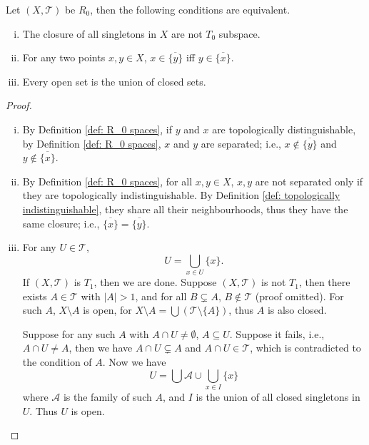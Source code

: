 \begin{proposition}
	\label{prop: alternative definitions of R_0 spaces}
	Let $(X, \mathcal T)$ be $R_0$, then the following conditions are equivalent.
	\begin{enumerate}[(i)]
		\item
		The closure of all singletons in $X$ are not $T_0$ subspace.
		
		\item
		For any two points $x,y \in X$, $x \in \overline{ \{y\} }$ iff $y \in \overline{ \{x\} }$.
		
		\item
		Every open set is the union of closed sets.
	\end{enumerate}
	
	\begin{proof}
		\
		\begin{enumerate}[(i)]
			\item
			By Definition \ref{def: R_0 spaces}, if $y$ and $x$ are topologically distinguishable, by Definition \ref{def: R_0 spaces}, $x$ and $y$ are separated; i.e., $x \notin \overline {\{y\}}$ and $y \notin \overline{\{x\}}$.
			
			\item
			By Definition \ref{def: R_0 spaces}, for all $x,y \in X$, $x,y$ are not separated only if they are topologically indistinguishable. By Definition \ref{def: topologically indistinguishable}, they share all their neighbourhoods, thus they have the same closure; i.e., $\overline{\{x\}} = \overline{\{y\}}$.
			
			\item
			For any $U \in \mathcal T$,
			$$
			U = \bigcup_{x \in U} \{x\}.
			$$
			If $(X, \mathcal T)$ is $T_1$, then we are done. Suppose $(X, \mathcal T)$ is not $T_1$, then there exists $A \in \mathcal T$ with $|A| > 1$, and for all $B \subsetneq A$, $B \notin \mathcal T$ (proof omitted). For such $A$, $X \setminus A$ is open, for $X \setminus A = \bigcup (\mathcal T \setminus \{A\})$, thus $A$ is also closed.
			
			Suppose for any such $A$ with $A \cap U \ne \emptyset$, $A \subseteq U$. Suppose it fails, i.e., $A \cap U \ne A$, then we have $A \cap U \subsetneq A$ and $A \cap U \in \mathcal T$, which is contradicted to the condition of $A$. Now we have
			$$
			U = \bigcup \mathcal A \cup \bigcup_{x \in I} \{x\}
			$$
			where $\mathcal A$ is the family of such $A$, and $I$ is the union of all closed singletons in $U$. Thus $U$ is open.
		\end{enumerate}
	\end{proof}
\end{proposition}


